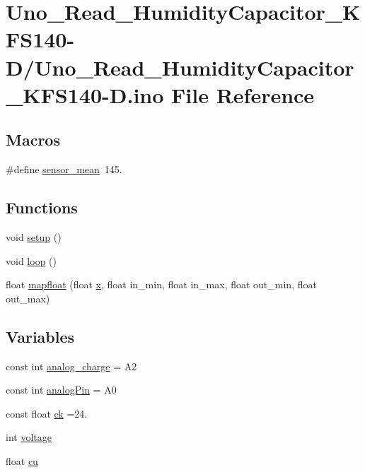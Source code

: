 \hypertarget{Uno__Read__HumidityCapacitor__KFS140-D_8ino}{\section{Uno\-\_\-\-Read\-\_\-\-Humidity\-Capacitor\-\_\-\-K\-F\-S140-\/\-D/\-Uno\-\_\-\-Read\-\_\-\-Humidity\-Capacitor\-\_\-\-K\-F\-S140-\/\-D.ino File Reference}
\label{Uno__Read__HumidityCapacitor__KFS140-D_8ino}
}
\subsection*{Macros}
\begin{DoxyCompactItemize}
\item 
\#define \hyperlink{Uno__Read__HumidityCapacitor__KFS140-D_8ino_a3cc91ed49729313b42d0d671fd4f0a8f}{sensor\-\_\-mean}~145.
\end{DoxyCompactItemize}
\subsection*{Functions}
\begin{DoxyCompactItemize}
\item 
void \hyperlink{Uno__Read__HumidityCapacitor__KFS140-D_8ino_a4fc01d736fe50cf5b977f755b675f11d}{setup} ()
\item 
void \hyperlink{Uno__Read__HumidityCapacitor__KFS140-D_8ino_afe461d27b9c48d5921c00d521181f12f}{loop} ()
\item 
float \hyperlink{Uno__Read__HumidityCapacitor__KFS140-D_8ino_ad4356009db72f8d1f602de671a9490b3}{mapfloat} (float \hyperlink{OWGeneric__SensorStation_8ino_ad0da36b2558901e21e7a30f6c227a45e}{x}, float in\-\_\-min, float in\-\_\-max, float out\-\_\-min, float out\-\_\-max)
\end{DoxyCompactItemize}
\subsection*{Variables}
\begin{DoxyCompactItemize}
\item 
const int \hyperlink{Uno__Read__HumidityCapacitor__KFS140-D_8ino_ae3837ad96d1cb4c43d0bbcfe912ad6a1}{analog\-\_\-charge} = A2
\item 
const int \hyperlink{Uno__Read__HumidityCapacitor__KFS140-D_8ino_a1dc085aeaaec657b48a2e349e1aa85be}{analog\-Pin} = A0
\item 
const float \hyperlink{Uno__Read__HumidityCapacitor__KFS140-D_8ino_af6d64b28844208eb6f2d9b7bcf4a6087}{ck} =24.
\item 
int \hyperlink{Uno__Read__HumidityCapacitor__KFS140-D_8ino_a003bbb537dac1547ff44bac4bf180a73}{voltage}
\item 
float \hyperlink{Uno__Read__HumidityCapacitor__KFS140-D_8ino_a0cb41c0b1068825d5ba9d6a1823f194c}{cu}
\end{DoxyCompactItemize}


